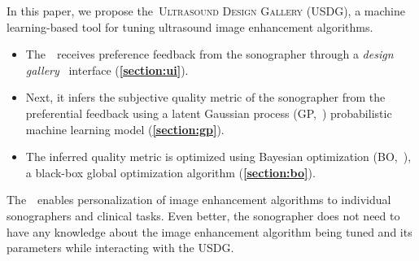 In this paper, we propose the~\textsc{Ultrasound Design Gallery} (USDG), a machine learning-based tool for tuning ultrasound image enhancement algorithms.
\begin{itemize}
    \item[\ding{228}] The~\usdg~receives preference feedback from the sonographer through a \textit{design gallery}~\cite{brochu_bayesian_2010, 10.1145/3072959.3073598, koyama_sequential_2020, phan_color_2018, pmlr-v119-mikkola20a} interface (\textbf{\cref{section:ui}}).
    \vspace{0.02in}
  \item[\ding{228}] Next, it infers the subjective quality metric of the sonographer from the preferential feedback using a latent Gaussian process (GP,~\cite{rasmussen_gaussian_2006, pmlr-v119-mikkola20a}) probabilistic machine learning model (\textbf{\cref{section:gp}}).
    \vspace{0.02in}
  \item[\ding{228}] The inferred quality metric is optimized using Bayesian optimization (BO,~\cite{shahriari_taking_2016}), a black-box global optimization algorithm (\textbf{\cref{section:bo}}).
\end{itemize}
The~\usdg~enables personalization of image enhancement algorithms to individual sonographers and clinical tasks.
Even better, the sonographer does not need to have any knowledge about the image enhancement algorithm being tuned and its parameters while interacting with the USDG.


